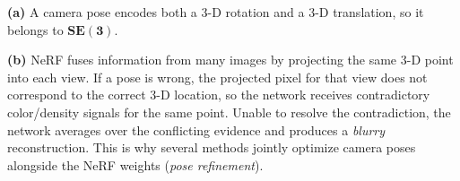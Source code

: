 \documentclass[12pt]{article}
\begin{document}
\begin{answerbox}
\textbf{(a)} A camera pose encodes both a 3-D rotation and a 3-D translation,
so it belongs to $\mathbf{SE(3)}$.

\textbf{(b)} NeRF fuses information from many images by projecting the same 3-D
point into each view.  If a pose is wrong, the projected pixel for that view
does not correspond to the correct 3-D location, so the network receives
contradictory color/density signals for the same point.  Unable to resolve the
contradiction, the network averages over the conflicting evidence and produces a
\emph{blurry} reconstruction.  This is why several methods jointly optimize
camera poses alongside the NeRF weights (\emph{pose refinement}).
\end{answerbox}
\end{document}
